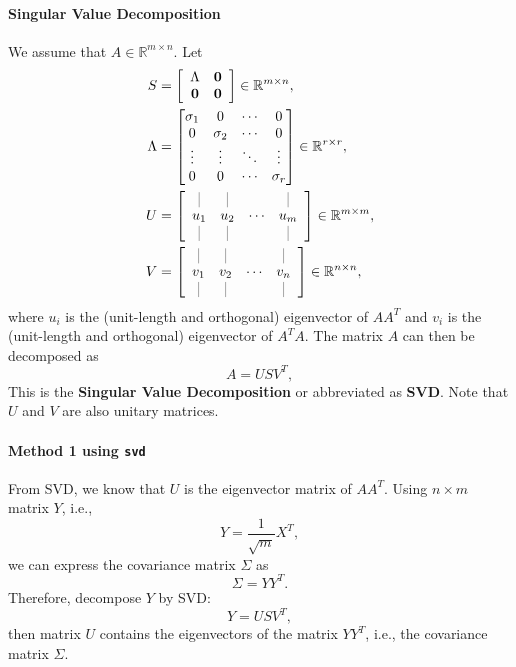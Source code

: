 \documentclass{article}
\newcommand*{\vertbar}{\rule[-0.75ex]{0.25pt}{2.5ex}}
\begin{document}
\paragraph{Singular Value Decomposition} We assume that $A\in\mathbb{R}^{m\times{n}}$. Let
\[
\begin{split}
S&=\left[\begin{array}{cc}
         \Lambda & \bm{0}\\
         \bm{0} & \bm{0}
   \end{array}\right]\in\mathbb{R}^{m\times n},\\
\Lambda&=\begin{bmatrix}
\sigma_1 & 0 & \cdots & 0\\
0 & \sigma_2 & \cdots & 0 \\
\vdots & \vdots & \ddots & \vdots\\
0 & 0 & \cdots & \sigma_r \\
\end{bmatrix}\in\mathbb{R}^{r\times r},\\
U&=\left[\begin{array}{cccc}
      \vertbar & \vertbar&        & \vertbar\\
      u_1  & u_2 & \cdots & u_m\\
      \vertbar & \vertbar&        & \vertbar
      \end{array}\right]\in\mathbb{R}^{m\times m},\\
V&=\left[\begin{array}{cccc}
      \vertbar & \vertbar&        & \vertbar\\
      v_1  & v_2 & \cdots & v_n\\
      \vertbar & \vertbar&        & \vertbar
      \end{array}\right]\in\mathbb{R}^{n\times n},
\end{split}
\]
where $u_i$ is the (unit-length and orthogonal) eigenvector of $AA^T$ and $v_i$ is the (unit-length and orthogonal) eigenvector of $A^TA$. The matrix $A$ can then be decomposed as
\[
A = U S V^T,
\]
This is the \textbf{Singular Value Decomposition} or abbreviated as \textbf{SVD}. Note that $U$ and $V$ are also unitary matrices.

\paragraph{Method 1 using \texttt{svd}} From SVD, we know that $U$ is the eigenvector matrix of $AA^T$. Using $n\times m$ matrix $Y$, i.e.,
\[
Y=\frac{1}{\sqrt{m}}X^T,
\]
we can express the covariance matrix $\Sigma$ as
\[
\Sigma=YY^T.
\]
Therefore, decompose $Y$ by SVD:
\[
Y=USV^T,
\]
then matrix $U$ contains the eigenvectors of the matrix $YY^T$, i.e., the covariance matrix $\Sigma$.
\end{document}
